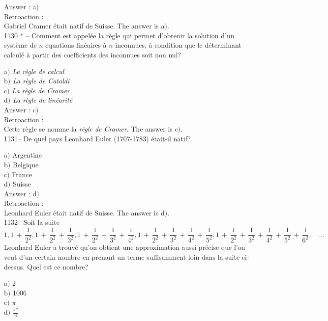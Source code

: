 ﻿\documentclass[letterpaper, 12pt]{article}
\begin{document}
Answer : a$)$\\

Retroaction : \\
Gabriel Cramer \'etait natif de Suisse.
The answer is a$)$.\\

1130 * -- Comment est appel\'ee la r\`egle qui permet d'obtenir la
solution d'un syst\`eme de $n$ equations lin\'eaires \`a $n$
inconnues, \`a condition que le d\'eterminant calcul\'e \`a partir
des coefficients des inconnues soit non nul?

a$)$ {\sl La r\`egle de calcul} \\
b$)$ {\sl La r\`egle de Cataldi} \\
c$)$ {\sl La r\`egle de Cramer} \\
d$)$ {\sl La r\`egle de lin\'earit\'e}   \\

Answer : c$)$\\

Retroaction : \\
Cette r\`egle se nomme la {\sl r\`egle de Cramer}.
The answer is c$)$.\\

1131-- De quel pays Leonhard Euler (1707-1783) \'etait-il natif?

a$)$ Argentine\\
b$)$ Belgique \\
c$)$ France  \\
d$)$ Suisse  \\


Answer : d$)$\\

Retroaction : \\
Leonhard Euler \'etait natif de Suisse. The answer is d$)$. \\

1132-- Soit la suite
$$\displaystyle{1,1\,+\,\frac1{2^2},1\,+\,\frac1{2^2}\,+\,\frac1{3^2},1\,+\,\frac1{2^2}\,+\,\frac1{3^2}\,+\,\frac1{4^2},
1\,+\,\frac1{2^2}\,+\,\frac1{3^2}\,+\,\frac1{4^2}\,+\,\frac1{5^2},
1\,+\,\frac1{2^2}\,+\,\frac1{3^2}\,+\,\frac1{4^2}\,+\,\frac1{5^2}\,+\,\frac1{6^2}},\quad\ldots$$
Leonhard Euler a trouv\'e qu'on obtient une approximation aussi
pr\'ecise que l'on veut d'un certain nombre en prenant un terme
suffisamment loin dans la suite ci-dessus. Quel est ce nombre?

a$)$ 2\\
b$)$ 1006 \\
c$)$ $\pi$ \\
d$)$ $\frac{\pi^2}6$\\
\end{document}
